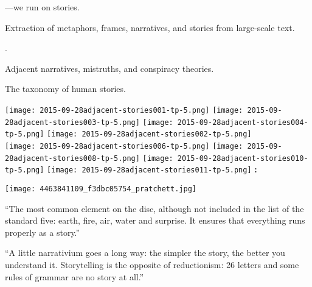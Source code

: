         ---we run on stories.
      
        Extraction of metaphors, frames, narratives, and stories from large-scale text.
       
        .
       
        Adjacent narratives, mistruths, and conspiracy theories.
       
        The taxonomy of human stories.
      
      \centering
      \texttt{[image: 2015-09-28adjacent-stories001-tp-5.png]}
      \texttt{[image: 2015-09-28adjacent-stories003-tp-5.png]}
      \texttt{[image: 2015-09-28adjacent-stories004-tp-5.png]}
      \texttt{[image: 2015-09-28adjacent-stories002-tp-5.png]}\\
      \texttt{[image: 2015-09-28adjacent-stories006-tp-5.png]}
      \texttt{[image: 2015-09-28adjacent-stories008-tp-5.png]}
      \texttt{[image: 2015-09-28adjacent-stories010-tp-5.png]}
      \texttt{[image: 2015-09-28adjacent-stories011-tp-5.png]}
  \small
  \textbf{
    :
  }
    
    \texttt{[image: 4463841109\_f3dbc05754\_pratchett.jpg]}
      
       
        ``The most common element on the disc, although not
        included in the list of the standard five: earth, fire, air,
        water and surprise. It ensures that everything runs properly
        as a story.''
      
        ``A little narrativium goes a long way: the simpler the story,
        the better you understand it. Storytelling is the opposite of
        reductionism: 26 letters and some rules of grammar are no story
        at all.''
  
    
    
